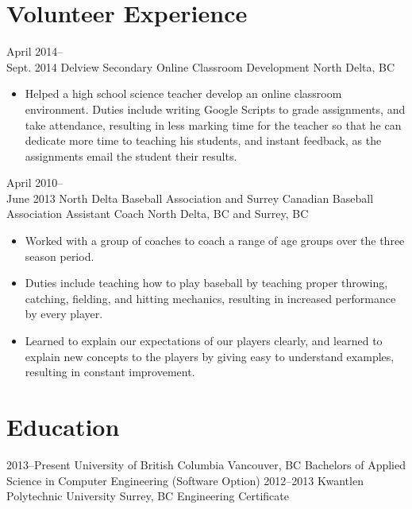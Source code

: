 \documentclass[]{friggeri-cv} %
\begin{document}
\section{Volunteer Experience}

\begin{entrylist}

\entry
{April 2014--\\Sept. 2014}
{Delview Secondary {\normalfont Online Classroom Development}}
{North Delta, BC}
{
\begin{itemize}
\item Helped a high school science teacher develop an online classroom
environment. Duties include writing Google
Scripts to grade assignments, and take attendance, resulting in less marking
time for the teacher so that he can
dedicate more time to teaching his students, and instant feedback, as the
assignments email the student their
results.
\end{itemize}
}

\newpage

\entry
{April 2010--\\June 2013}
{North Delta Baseball Association and Surrey Canadian Baseball Association {\normalfont Assistant Coach}}
{North Delta, BC and Surrey, BC}
{
\begin{itemize}
\item Worked with a group of coaches to coach a range of age groups over the three
season period.
\item Duties include teaching how to play baseball by teaching proper throwing,
catching, fielding, and hitting
mechanics, resulting in increased performance by every player.
\item Learned to explain our expectations of our players clearly, and learned to
explain new concepts to the players
by giving easy to understand examples, resulting in constant improvement.
\end{itemize}
}
\end{entrylist}


\section{Education}

\begin{entrylist}
\entry
{2013--Present}
{University of British Columbia}  %
{Vancouver, BC}
{Bachelors of Applied Science in Computer Engineering (Software Option)}
\entry
{2012--2013}
{Kwantlen Polytechnic University} %
{Surrey, BC}
{Engineering Certificate}
\end{entrylist}
\end{document}
